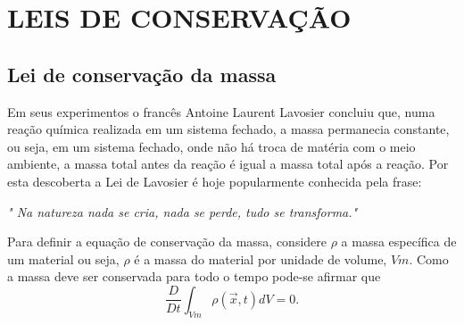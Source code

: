 
\section{LEIS DE CONSERVAÇÃO} \label{Leis}

\subsection{Lei de conservação da massa}

Em seus experimentos o francês Antoine Laurent Lavosier concluiu que, numa reação química realizada em um sistema fechado, a massa permanecia constante, ou seja, em um sistema fechado, onde não há troca de matéria com o meio ambiente, a massa total antes da reação é igual a massa total após a reação. Por esta descoberta a Lei de Lavosier é hoje popularmente conhecida pela frase:

\begin{center}
\textit{" Na natureza nada se cria, nada se perde, tudo se transforma."}
\end{center}

Para definir a equação de conservação da massa, considere $\rho$ a massa específica de um material ou seja, $\rho$ é a massa do material por unidade de volume, $Vm$. Como a massa deve ser conservada para todo o tempo pode-se afirmar que
\begin{equation} \label{lei_conser_massa}
\dfrac{D}{Dt} \int_{Vm} \rho ( \vec{x} , t) dV=0.
\end{equation}

